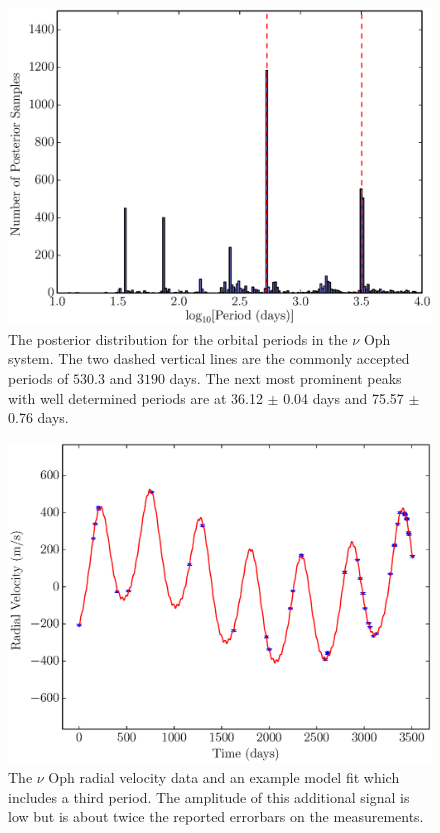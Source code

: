 \documentclass[useAMS,usenatbib]{mn2e}
\begin{document}
\begin{figure}
\includegraphics[scale=0.45]{Figures/nu_oph_periods.eps}
\caption{The posterior distribution for the orbital periods in the $\nu$ Oph
system. The two dashed vertical lines are the commonly accepted periods
of $530.3$ and $3190$ days. The next most prominent peaks with well determined
periods are at 36.12 $\pm$ 0.04 days and
75.57 $\pm$ 0.76 days.\label{fig:nu_oph_periods}}
\end{figure}

\begin{figure}
\includegraphics[scale=0.45]{Figures/nuoph.eps}
\caption{The $\nu$ Oph radial velocity data and an example model fit which
includes a third period. The amplitude of this additional signal is low but
is about twice the reported errorbars on the measurements.\label{fig:nuoph}}
\end{figure}
\end{document}

